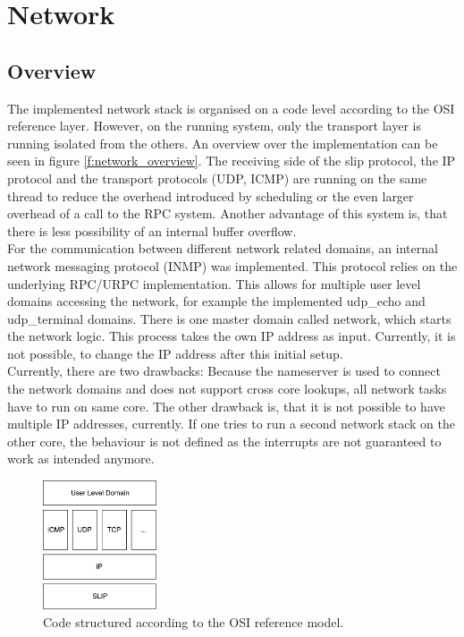 \section{Network}\label{s:network}
\subsection{Overview}
The implemented network stack is organised on a code level according to the OSI reference layer. However, on the running system, only the transport layer is running isolated from the others. An overview over the implementation can be seen in figure \ref{f:network_overview}. The receiving side of the slip protocol, the IP protocol and the transport protocols (UDP, ICMP) are running on the same thread to reduce the overhead introduced by scheduling or the even larger overhead of a call to the RPC system. Another advantage of this system is, that there is less possibility of an internal buffer overflow.\\
For the communication between different network related domains, an internal network messaging protocol (INMP) was implemented. This protocol relies on the underlying RPC/URPC implementation. This allows for multiple user level domains accessing the network, for example the implemented udp\_echo and udp\_terminal domains. There is one master domain called network, which starts the network logic. This process takes the own IP address as input. Currently, it is not possible, to change the IP address after this initial setup. \\
Currently, there are two drawbacks: Because the nameserver is used to connect the network domains and does not support cross core lookups, all network tasks have to run on same core. The other drawback is, that it is not possible to have multiple IP addresses, currently. If one tries to run a second network stack on the other core, the behaviour is not defined as the interrupts are not guaranteed to work as intended anymore.

\begin{figure}
\centering
		\includegraphics[width=0.3\textwidth]{Images/Network}
		\caption{Code structured according to the OSI reference model.}
\end{figure}

